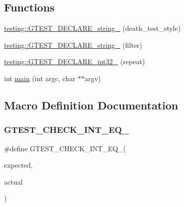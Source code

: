 \subsection*{Functions}
\begin{DoxyCompactItemize}
\item 
\mbox{\hyperlink{namespacetesting_a37b7e87f0a5f502c6918f37d1768c1f3}{testing\+::\+G\+T\+E\+S\+T\+\_\+\+D\+E\+C\+L\+A\+R\+E\+\_\+string\+\_\+}} (death\+\_\+test\+\_\+style)
\item 
\mbox{\hyperlink{namespacetesting_a20d69860ce843142c7f740262e6b0c9a}{testing\+::\+G\+T\+E\+S\+T\+\_\+\+D\+E\+C\+L\+A\+R\+E\+\_\+string\+\_\+}} (filter)
\item 
\mbox{\hyperlink{namespacetesting_a315ef0647e4f2795bf1705de8e9c9659}{testing\+::\+G\+T\+E\+S\+T\+\_\+\+D\+E\+C\+L\+A\+R\+E\+\_\+int32\+\_\+}} (repeat)
\item 
int \mbox{\hyperlink{_obj__test_2lib_2googletest-release-1_88_81_2googletest_2test_2gtest__repeat__test_8cc_a3c04138a5bfe5d72780bb7e82a18e627}{main}} (int argc, char $\ast$$\ast$argv)
\end{DoxyCompactItemize}


\subsection{Macro Definition Documentation}
\mbox{\label{_obj__test_2lib_2googletest-release-1_88_81_2googletest_2test_2gtest__repeat__test_8cc_a7e5ba7c523079f679398b4c730184de3}} 
\subsubsection{\texorpdfstring{GTEST\_CHECK\_INT\_EQ\_}{GTEST\_CHECK\_INT\_EQ\_}}
{\footnotesize\ttfamily \#define G\+T\+E\+S\+T\+\_\+\+C\+H\+E\+C\+K\+\_\+\+I\+N\+T\+\_\+\+E\+Q\+\_\+(\begin{DoxyParamCaption}\item[{}]{expected,  }\item[{}]{actual }\end{DoxyParamCaption})}

